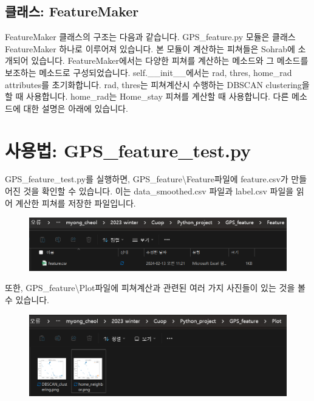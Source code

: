 \documentclass{oblivoir}
\begin{document}
  \subsection{클래스: FeatureMaker}
  FeatureMaker 클래스의 구조는 다음과 같습니다.
  GPS\_feature.py 모듈은 클래스 FeatureMaker 하나로 이루어져 있습니다.
  본 모듈이 계산하는 피쳐들은 Sohrab\cite{Sohrab}에 소개되어 있습니다.
  FeatureMaker에서는 다양한 피쳐를 계산하는 메소드와 그 메소드를 보조하는 메소드로 구성되었습니다.
  self.\_\_init\_\_에서는 rad, thres, home\_rad attributes를 초기화합니다. 
  rad, thres는 피쳐계산시 수행하는 DBSCAN clustering을 할 때 사용합니다.
  home\_rad는 Home\_stay 피쳐를 계산할 때 사용합니다.
  다른 메소드에 대한 설명은 아래에 있습니다.

  \section{사용법: GPS\_feature\_test.py}
  GPS\_feature\_test.py를 실행하면, GPS\_feature\textbackslash Feature파일에 feature.csv가 만들어진 것을 확인할 수 있습니다.
  이는 data\_smoothed.csv 파일과 label.csv 파일을 읽어 계산한 피쳐를 저장한 파일입니다.
  \begin{figure}[H]
    \includegraphics[width=\textwidth]{GPS_feature_2.png}
  \end{figure}
  또한, GPS\_feature\textbackslash Plot파일에 피쳐계산과 관련된 여러 가지 사진들이 있는 것을 볼 수 있습니다.
  \begin{figure}[H]
    \includegraphics[width=\textwidth]{GPS_feature_3.png}
  \end{figure}
\end{document}
